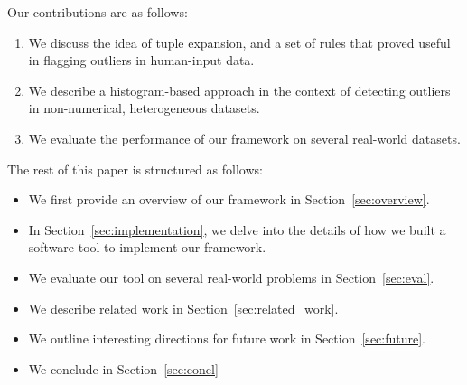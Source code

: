 Our contributions are as follows:
\begin{enumerate}
\item We discuss the idea of tuple expansion, and a set of rules that proved useful in flagging outliers in human-input data.
\item We describe a histogram-based approach in the context of detecting outliers in non-numerical, heterogeneous datasets.
\item We evaluate the performance of our framework on several real-world datasets.
\end{enumerate}

The rest of this paper is structured as follows:
\begin{itemize}
\item We first provide an overview of our framework in Section~\ref{sec:overview}.
\item In Section~\ref{sec:implementation}, we delve into the details of how we built a software tool to implement our framework.
\item We evaluate our tool on several real-world problems in Section~\ref{sec:eval}.
\item We describe related work in Section~\ref{sec:related_work}.
\item We outline interesting directions for future work in Section~\ref{sec:future}.
\item We conclude in Section~\ref{sec:concl}
\end{itemize}
